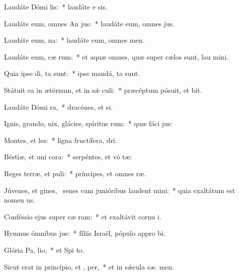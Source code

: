 \item Laudáte Dómi  lis:~* laudáte e  sis.
\item Laudáte eum, omnes An jus:~* laudáte eum, omnes  jus.
\item Laudáte eum,   na:~* laudáte eum, omnes   men.
\item Laudáte eum, cæ rum:~* et aquæ omnes, quæ super cælos sunt, lau  mini.
\item Quia ipse di,  ta sunt:~* ipse mandá,  ta sunt.
\item Státuit ea in ætérnum, et in sǽ culi:~* præcéptum pósuit, et  bit.
\item Laudáte Dómi  ra,~* dracónes, et  si.
\item Ignis, grando, nix, glácies, spíritus rum:~* quæ fáci  jus:
\item Montes, et  les:~* ligna fructífera,   dri.
\item Béstiæ, et uni cora:~* serpéntes, et vó tæ:
\item Reges terræ, et  puli:~* príncipes, et omnes  ræ.
\item Júvenes, et gines,~\pscross{} senes cum junióribus laudent  mini:~* quia exaltátum est nomen  us.
\item Conféssio ejus super cæ  ram:~* et exaltávit cornu  i.
\item Hymnus ómnibus  jus:~* fíliis Israël, pópulo appro bi.
\item Glória Pa,  lio,~* et Spi to.
\item Sicut erat in princípio, et ,  per,~* et in sǽcula sæ. men.
